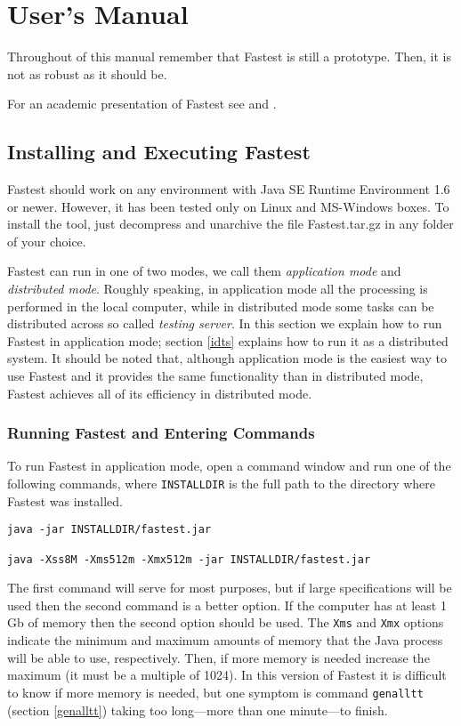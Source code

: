 \section{\label{um}User's Manual}

Throughout of this manual remember that Fastest is still a prototype. Then, it is not as robust as it should be.

For an academic presentation of Fastest see \cite{CristiaPRM} and \cite{CristiaARM}.

\subsection{\label{ief}Installing and Executing Fastest}

Fastest should work on any environment with Java SE Runtime Environment 1.6 or newer. However, it has been tested only on Linux and MS-Windows boxes. To install the tool, just decompress and unarchive the file Fastest.tar.gz in any folder of your choice. 

Fastest can run in one of two modes, we call them \textit{application mode} and \textit{distributed mode}. Roughly speaking, in application mode all the processing is performed in the local computer, while in distributed mode some tasks can be distributed across so called {\it testing server}. In this section we explain how to run Fastest in application mode; section \ref{idts} explains how to run it as a distributed system. It should be noted that, although application mode is the easiest way to use Fastest and it provides the same functionality than in distributed mode, Fastest achieves all of its efficiency in distributed mode. 

\subsubsection{\label{readline}Running Fastest and Entering Commands}
To run Fastest in application mode, open a command window and run one of the following commands, where \verb+INSTALLDIR+ is the full path to the directory where Fastest was installed.

\begin{verbatim}
java -jar INSTALLDIR/fastest.jar

java -Xss8M -Xms512m -Xmx512m -jar INSTALLDIR/fastest.jar
\end{verbatim}

The first command will serve for most purposes, but if large specifications will be used then the second command is a better option. If the computer has at least 1 Gb of memory then the second option should be used. The \verb+Xms+ and \verb+Xmx+ options indicate the minimum and maximum amounts of memory that the Java process will be able to use, respectively. Then, if more memory is needed increase the maximum (it must be a multiple of 1024). In this version of Fastest it is difficult to know if more memory is needed, but one symptom is command \verb+genalltt+ (section \ref{genalltt}) taking too long---more than one minute---to finish.

